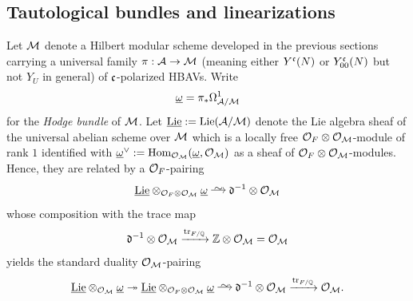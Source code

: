 \documentclass[main.tex]{subfiles}
\begin{document}
\subsection{Tautological bundles and linearizations}

Let $\mathcal{M}$ denote a Hilbert modular scheme developed in the previous sections carrying a universal family $\pi : \mathcal{A} \to \mathcal{M}$ (meaning either $Y^{\mathfrak{c}}(N)$ or $Y^{\mathfrak{c}}_{00}(N)$ but not $Y_U$ in general) of $\mathfrak{c}$-polarized HBAVs. Write 
\[ \underline{\omega} = \pi_* \Omega^1_{\mathcal{A}/\mathcal{M}} \]
for the \textit{Hodge bundle} of $\mathcal{M}$. 
Let $\underline{\mathrm{Lie}} := \mathrm{Lie}(\mathcal{A}/\mathcal{M})$ denote the Lie algebra sheaf of the universal abelian scheme over $\mathcal{M}$ which is a locally free $\mathcal{O}_F \otimes \mathcal{O}_{\mathcal{M}}$-module of rank $1$ identified with $\underline{\omega}^{\vee} := \operatorname{\mathrm{Hom}}_{\mathcal{O}_{\mathcal{M}}}(\underline{\omega}, \mathcal{O}_{\mathcal{M}})$ as a sheaf of $\mathcal{O}_F \otimes \mathcal{O}_{\mathcal{M}}$-modules. Hence, they are related by a $\mathcal{O}_F$-pairing
\[ \ul{\Lie} \ot_{\cO_F \ot \cO_{\cM}} \ul{\omega} \iso \dd^{-1} \ot \cO_{\cM} \]
whose composition with the trace map
\[ \mathfrak{d}^{-1} \otimes \mathcal{O}_{\mathcal{M}} \xrightarrow{\operatorname{\mathrm{tr}}_{F/\mathbb{Q}}} \mathbb{Z} \otimes \mathcal{O}_{\mathcal{M}} = \mathcal{O}_{\mathcal{M}} \]
yields the standard duality $\mathcal{O}_{\mathcal{M}}$-pairing
\[ \ul{\Lie} \ot_{\cO_{\cM}} \ul{\omega} \onto \ul{\Lie} \ot_{\cO_F \ot \cO_{\cM}} \ul{\omega} \iso \dd^{-1} \ot \cO_{\cM} \xrightarrow{\tr_{F/\Q}}  \cO_{\cM}. \]
\end{document}
